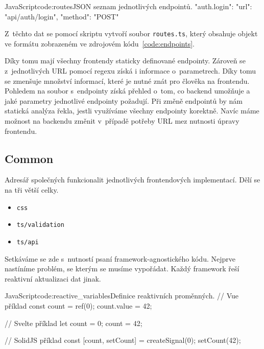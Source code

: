 \documentclass[
  master,
  program=ainf,
  tables=false,
  sourcecodes,
  glossaries,
  index
]{kidiplom}
\begin{document}
\begin{kicode}{JavaScript}{code:routes}{JSON seznam jednotlivých endpointů.}
{
  "auth.login":{
    "url": "api/auth/login",
    "method": "POST"
  }
}
\end{kicode}


Z~těchto dat se pomocí skriptu vytvoří soubor {\tt routes.ts}, který obsahuje objekt ve formátu zobrazeném 
ve zdrojovém kódu~\ref{code:endpoints}.


Díky tomu mají všechny frontendy staticky definované endpointy. Zároveň se
z~jednotlivých URL pomocí regexu získá i informace o~parametrech. Díky tomu 
se zmenšuje množství informací, které je nutné znát pro člověka na frontendu.
Pohledem na soubor s~endpointy získá přehled o~tom, co backend umožňuje a jaké
parametry jednotlivé endpointy požadují. Při změně endpointů by nám statická analýza
řekla, jestli využíváme všechny endpointy korektně. Navíc máme možnost na backendu
změnit v~případě potřeby URL mez nutnosti úpravy frontendu.

\subsection{Common}
Adresář společných funkcionalit jednotlivých frontendových implementací. Dělí se
na tři větší celky.

\begin{itemize}
  \item {\tt css}
  \item {\tt ts/validation}
  \item {\tt ts/api}
\end{itemize}

Setkáváme se zde s~nutností psaní framework-agnostického kódu. Nejprve
nastíníme problém, se kterým se musíme vypořádat. Každý framework řeší
reaktivní aktualizaci dat jinak.

\begin{kicode}{JavaScript}{code:reactive_variables}{Definice reaktivních proměnných.}
  // Vue příklad
  const count = ref(0);
  count.value = 42;

  // Svelte příklad
  let count = 0;
  count = 42;

  // SolidJS příklad
  const [count, setCount] = createSignal(0);
  setCount(42);
\end{kicode}
\end{document}
